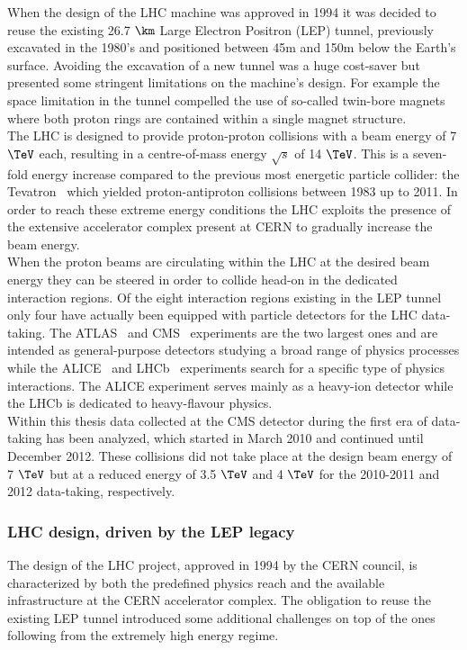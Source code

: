 When the design of the LHC machine was approved in 1994 it was decided to reuse the existing 26.7 $\km$ Large Electron Positron (LEP) tunnel, previously excavated in the 1980's and positioned between 45m and 150m below the Earth's surface.
Avoiding the excavation of a new tunnel was a huge cost-saver but presented some stringent limitations on the machine's design. For example the space limitation in the tunnel compelled the use of so-called twin-bore magnets where both proton rings are contained within a single magnet structure.
\\
The LHC is designed to provide proton-proton collisions with a beam energy of 7 $\TeV$ each, resulting in a centre-of-mass energy $\sqrt{s}$ of 14 $\TeV$. This is a seven-fold energy increase compared to the previous most energetic particle collider: the Tevatron~\cite{?} which yielded proton-antiproton collisions between 1983 up to 2011. In order to reach these extreme energy conditions the LHC exploits the presence of the extensive accelerator complex present at CERN to gradually increase the beam energy. 
\\
When the proton beams are circulating within the LHC at the desired beam energy they can be steered in order to collide head-on in the dedicated interaction regions. Of the eight interaction regions existing in the LEP tunnel only four have actually been equipped with particle detectors for the LHC data-taking. The ATLAS~\cite{AtlasDetectorPaper} and CMS~\cite{CMSDetectorPaper} experiments are the two largest ones and are intended as general-purpose detectors studying a broad range of physics processes while the ALICE~\cite{AliceDetectorPaper} and LHCb~\cite{LHCbDetectorPaper} experiments search for a specific type of physics interactions. The ALICE experiment serves mainly as a heavy-ion detector while the LHCb is dedicated to heavy-flavour physics.
\\
Within this thesis data collected at the CMS detector during the first era of data-taking has been analyzed, which started in March 2010 and continued until December 2012. These collisions did not take place at the design beam energy of 7 $\TeV$ but at a reduced energy of 3.5 $\TeV$ and 4 $\TeV$ for the 2010-2011 and 2012 data-taking, respectively.

\subsubsection{LHC design, driven by the LEP legacy}
The design of the LHC project, approved in 1994 by the CERN council, is characterized by both the predefined physics reach and the available infrastructure at the CERN accelerator complex.
The obligation to reuse the existing LEP tunnel introduced some additional challenges on top of the ones following from the extremely high energy regime. 
\\

